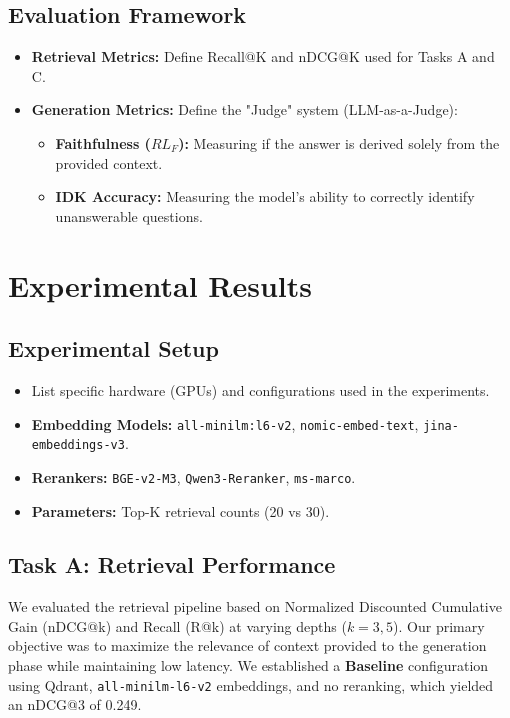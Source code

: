 \documentclass[11pt]{article}
\begin{document}
\subsection{Evaluation Framework}
\begin{itemize}
    \item \textbf{Retrieval Metrics:} Define Recall@K and nDCG@K used for Tasks A and C.
    \item \textbf{Generation Metrics:} Define the "Judge" system (LLM-as-a-Judge):
    \begin{itemize}
        \item \textbf{Faithfulness ($RL_F$):} Measuring if the answer is derived solely from the provided context.
        \item \textbf{IDK Accuracy:} Measuring the model's ability to correctly identify unanswerable questions.
    \end{itemize}
\end{itemize}

\section{Experimental Results}



\subsection{Experimental Setup}
\begin{itemize}
    \item List specific hardware (GPUs) and configurations used in the experiments.
    \item \textbf{Embedding Models:} \texttt{all-minilm:l6-v2}, \texttt{nomic-embed-text}, \texttt{jina-embeddings-v3}.
    \item \textbf{Rerankers:} \texttt{BGE-v2-M3}, \texttt{Qwen3-Reranker}, \texttt{ms-marco}.
    \item \textbf{Parameters:} Top-K retrieval counts (20 vs 30).
\end{itemize}

\subsection{Task A: Retrieval Performance}
\label{subsec:task_a_results}

We evaluated the retrieval pipeline based on Normalized Discounted Cumulative Gain (nDCG@k) and Recall (R@k) at varying depths ($k=3, 5$). Our primary objective was to maximize the relevance of context provided to the generation phase while maintaining low latency. We established a \textbf{Baseline} configuration using Qdrant, \texttt{all-minilm-l6-v2} embeddings, and no reranking, which yielded an nDCG@3 of 0.249.
\end{document}
